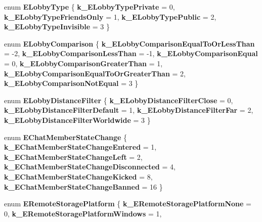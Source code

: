 \begin{DoxyCompactItemize}
enum {\bfseries E\+Lobby\+Type} \{ {\bfseries k\+\_\+\+E\+Lobby\+Type\+Private} = 0, 
{\bfseries k\+\_\+\+E\+Lobby\+Type\+Friends\+Only} = 1, 
{\bfseries k\+\_\+\+E\+Lobby\+Type\+Public} = 2, 
{\bfseries k\+\_\+\+E\+Lobby\+Type\+Invisible} = 3
 \}
\item 
\mbox{\label{namespace_valve_1_1_steamworks_a0c06ec5c97875fe513e82a7637c00e23}} 
enum {\bfseries E\+Lobby\+Comparison} \{ \newline
{\bfseries k\+\_\+\+E\+Lobby\+Comparison\+Equal\+To\+Or\+Less\+Than} = -\/2, 
{\bfseries k\+\_\+\+E\+Lobby\+Comparison\+Less\+Than} = -\/1, 
{\bfseries k\+\_\+\+E\+Lobby\+Comparison\+Equal} = 0, 
{\bfseries k\+\_\+\+E\+Lobby\+Comparison\+Greater\+Than} = 1, 
\newline
{\bfseries k\+\_\+\+E\+Lobby\+Comparison\+Equal\+To\+Or\+Greater\+Than} = 2, 
{\bfseries k\+\_\+\+E\+Lobby\+Comparison\+Not\+Equal} = 3
 \}
\item 
\mbox{\label{namespace_valve_1_1_steamworks_a949755a3443dab62f085efe79b6da1e3}} 
enum {\bfseries E\+Lobby\+Distance\+Filter} \{ {\bfseries k\+\_\+\+E\+Lobby\+Distance\+Filter\+Close} = 0, 
{\bfseries k\+\_\+\+E\+Lobby\+Distance\+Filter\+Default} = 1, 
{\bfseries k\+\_\+\+E\+Lobby\+Distance\+Filter\+Far} = 2, 
{\bfseries k\+\_\+\+E\+Lobby\+Distance\+Filter\+Worldwide} = 3
 \}
\item 
\mbox{\label{namespace_valve_1_1_steamworks_a2d20642a576fc47c2ae37276510f31d3}} 
enum {\bfseries E\+Chat\+Member\+State\+Change} \{ \newline
{\bfseries k\+\_\+\+E\+Chat\+Member\+State\+Change\+Entered} = 1, 
{\bfseries k\+\_\+\+E\+Chat\+Member\+State\+Change\+Left} = 2, 
{\bfseries k\+\_\+\+E\+Chat\+Member\+State\+Change\+Disconnected} = 4, 
{\bfseries k\+\_\+\+E\+Chat\+Member\+State\+Change\+Kicked} = 8, 
\newline
{\bfseries k\+\_\+\+E\+Chat\+Member\+State\+Change\+Banned} = 16
 \}
\item 
\mbox{\label{namespace_valve_1_1_steamworks_ad910a2698cafc253afc8d9ddbf9183e9}} 
enum {\bfseries E\+Remote\+Storage\+Platform} \{ \newline
{\bfseries k\+\_\+\+E\+Remote\+Storage\+Platform\+None} = 0, 
{\bfseries k\+\_\+\+E\+Remote\+Storage\+Platform\+Windows} = 1, 

\end{DoxyCompactItemize}
